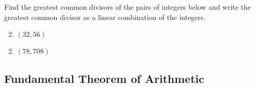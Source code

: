 \documentclass{ximera}
\begin{document}
\begin{br}
Find the greatest common divisors of the pairs of integers below and write the greatest common divisor as a linear combination of the integers.
\begin{enumerate}[label=32(\alph*)]
	

	\setcounter{enumi}{1}
	\item $(32,56)$
	 

	\setcounter{enumi}{3}

\end{enumerate}


\begin{enumerate}[label=54(\alph*)]
	\setcounter{enumi}{1}
	\item $(78,708)$
	 
\end{enumerate}
\end{br}

\subsection{Fundamental Theorem of Arithmetic}
\end{document}
